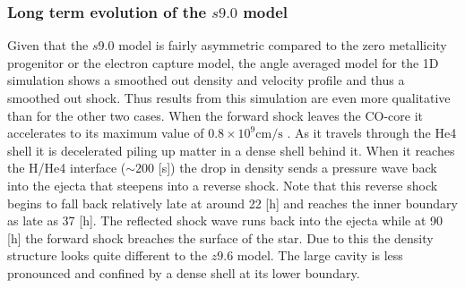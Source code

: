 \documentclass[fleqn,usenatbib]{mnras}
\newcommand{\nickel}{$\mathrm{Ni^{56}}$\xspace}
\begin{document}

\subsubsection{Long term evolution of the $s9.0$ model}
Given that the $s9.0$ model is fairly asymmetric compared to the zero metallicity progenitor or the electron capture model, the angle averaged model for the 1D simulation shows a smoothed out density and velocity profile and thus a smoothed out shock. Thus results from this simulation are even more qualitative than for the other two cases.
When the forward shock leaves the CO-core it accelerates to its maximum value of $0.8\times 10^{9}\mathrm{cm/s}$ . As it travels through the He4 shell it is decelerated piling up matter in a dense shell behind it. When it reaches the H/He4 interface ($\sim 200$ [s]) the drop in density sends a pressure wave back into the ejecta that steepens into a reverse shock. Note that this reverse shock begins to fall back relatively late at around 22 [h] and reaches the inner boundary as late as 37 [h]. The reflected shock wave runs back into the ejecta while at 90 [h] the forward shock breaches the surface of the star. Due to this the density structure looks quite different to the $z9.6$ model. The large cavity is less pronounced and confined by a dense shell at its lower boundary. 
\end{document}
